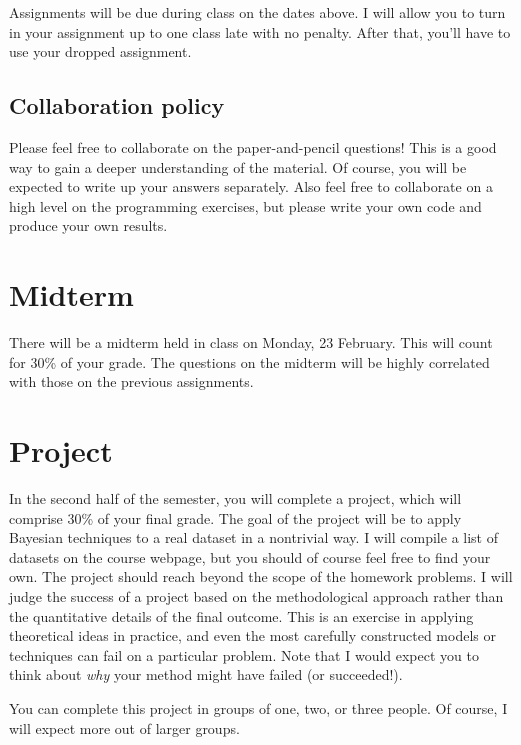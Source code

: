 \documentclass{article}
\begin{document}
Assignments will be due during class on the dates above.  I will allow
you to turn in your assignment up to one class late with no penalty.
After that, you'll have to use your dropped assignment.

\subsection*{Collaboration policy}

Please feel free to collaborate on the paper-and-pencil questions!
This is a good way to gain a deeper understanding of the material.  Of
course, you will be expected to write up your answers separately.
Also feel free to collaborate on a high level on the programming
exercises, but please write your own code and produce your own
results.

\section*{Midterm}

There will be a midterm held in class on Monday, 23 February.  This
will count for 30\% of your grade.  The questions on the midterm will
be highly correlated with those on the previous assignments.

\section*{Project}

In the second half of the semester, you will complete a project, which
will comprise 30\% of your final grade. The goal of the project will
be to apply Bayesian techniques to a real dataset in a nontrivial way.
I will compile a list of datasets on the course webpage, but you
should of course feel free to find your own.  The project should reach
beyond the scope of the homework problems.  I will judge the success
of a project based on the methodological approach rather than the
quantitative details of the final outcome.  This is an exercise in
applying theoretical ideas in practice, and even the most carefully
constructed models or techniques can fail on a particular problem.
Note that I would expect you to think about \emph{why} your method
might have failed (or succeeded!).

You can complete this project in groups of one, two, or three people.
Of course, I will expect more out of larger groups.
\end{document}

